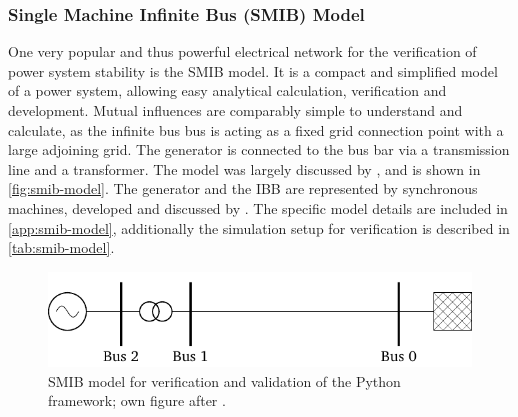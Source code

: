 \subsubsection{Single Machine Infinite Bus (SMIB) Model}

One very popular and thus powerful electrical network for the verification of power system stability is the \acs{SMIB} model. 
It is a compact and simplified model of a power system, allowing easy analytical calculation, verification and development. 
Mutual influences are comparably simple to understand and calculate, as the infinite bus bus is acting as a fixed grid connection point with a large adjoining grid. 
The generator is connected to the bus bar via a transmission line and a transformer. 
The model was largely discussed by \textcite{kundur_2022}, and is shown in \autoref{fig:smib-model}. 
The generator and the \acs{IBB} are represented by synchronous machines, developed and discussed by \textcite{kordowich_2023}. 
The specific model details are included in \autoref{app:smib-model}, additionally the simulation setup for verification is described in \autoref{tab:smib-model}.

\begin{figure}[htb]
    \centering
    \vspace{12pt}
    \includegraphics{tikz_graphics/images/smib_model.pdf}
    \vspace{12pt}
    \caption[Single line respresentation of the \acs{SMIB} model]{\acf{SMIB} model for verification and validation of the Python framework; own figure after \autocite{machowski_2020,kundur_2022}.}
    \label{fig:smib-model}
\end{figure}


